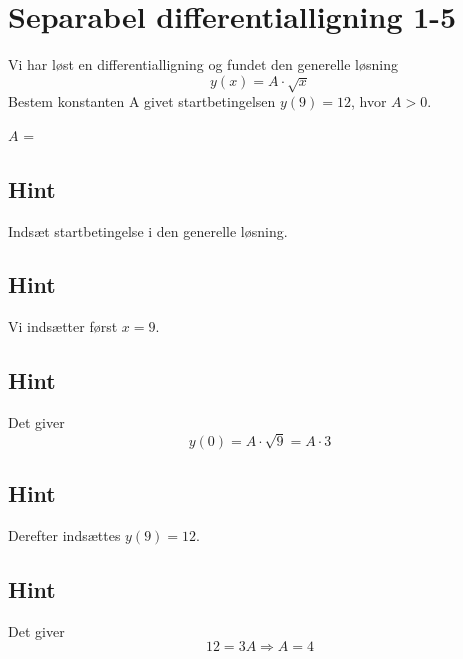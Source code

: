 \documentclass{article}
\newenvironment{exercise}[1]{\newpage\section{#1}}{}
\newcommand{\answerbox}[1]{\fbox{$#1$}}
\newcommand{\hint}{\subsection*{Hint}}
\begin{document}
\begin{exercise}{Separabel differentialligning 1-5}
	
	
	Vi har løst en differentialligning og fundet den generelle løsning
	\[
	y(x) =  A \cdot \sqrt{x}
	\]
	Bestem konstanten A givet startbetingelsen $y(9)=12$, hvor $A>0$.
	
	$A$ = \answerbox{4}
	
	\hint
	
	Indsæt startbetingelse i den generelle løsning. 
	
	
	\hint
	
	Vi indsætter først $x=9$.
	
	\hint
	
	Det giver
	\[
	y(0)=  A \cdot \sqrt{9} = A	\cdot 3
	\]
	
	\hint
	
	Derefter indsættes $y(9)=12$.
	
	\hint 
	
	Det giver 
	\[
	12  = 3A  \Rightarrow A = 4
	\]
	
\end{exercise}
\end{document}
